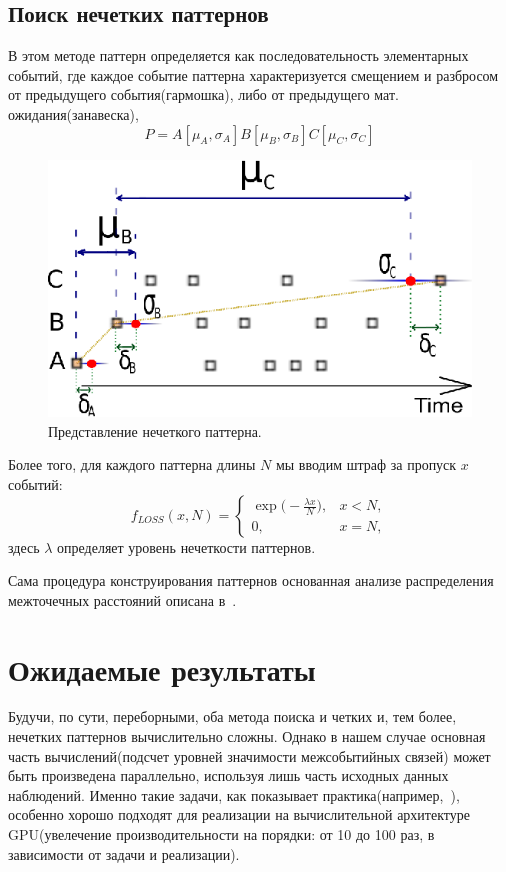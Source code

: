 \documentclass[12pt]{article}
\begin{document}
\subsection{Поиск нечетких паттернов}
В этом методе паттерн определяется как последовательность элементарных событий,
где каждое событие паттерна характеризуется смещением и разбросом от предыдущего события(гармошка), 
либо от предыдущего мат. ожидания(занавеска),
$$P=A[\mu_A,\sigma_A]B[\mu_B,\sigma_B]C[\mu_C,\sigma_C]$$
\begin{figure}[H]
	\noindent
	\begin{flushleft}
	\includegraphics[scale=1.8]{il1.eps}
	\end{flushleft}
	\caption{Представление нечеткого паттерна.}
\end{figure}

Более того, для каждого паттерна длины $N$ мы вводим штраф за пропуск $x$ событий:
  $$
  f_{LOSS}(x,N)= \begin{cases}
   \exp\bigl(-\frac{\lambda x}{N}\bigr), & x < N, \\
   0,                                    & x=N,
   \end{cases}
  $$
 здесь $\lambda$ определяет уровень нечеткости паттернов.
 
Сама процедура конструирования паттернов основанная анализе распределения
межточечных расстояний описана в~\cite{MB_article}.
\section{Ожидаемые результаты}
Будучи, по сути, переборными, оба метода поиска и четких и, тем более, 
нечетких паттернов вычислительно
сложны. Однако в нашем случае основная часть вычислений(подсчет уровней
значимости межсобытийных связей) может быть произведена параллельно, используя
лишь часть исходных данных наблюдений. Именно такие задачи, как показывает
практика(например,~\cite{gpu1, gpu2}), особенно хорошо подходят для реализации
на вычислительной архитектуре GPU(увелечение производительности на порядки: от 10
до 100 раз, в зависимости от задачи и реализации).
\end{document}
